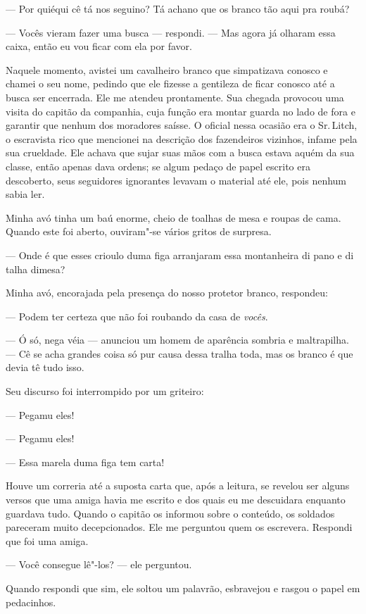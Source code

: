 --- Por quiéqui cê tá nos seguino? Tá achano que os branco tão aqui pra
roubá?

--- Vocês vieram fazer uma busca ---
respondi. --- Mas agora já olharam essa caixa, então eu vou ficar com
ela por favor.

Naquele momento, avistei um cavalheiro
branco que simpatizava conosco e chamei o seu nome, pedindo que ele
fizesse a gentileza de ficar conosco até a busca ser encerrada. Ele me
atendeu prontamente. Sua chegada provocou uma visita do capitão da
companhia, cuja função era montar guarda no lado de fora e garantir que
nenhum dos moradores saísse. O oficial nessa ocasião era o Sr.\,Litch, o
escravista rico que mencionei na descrição dos fazendeiros vizinhos,
infame pela sua crueldade. Ele achava que sujar suas mãos com a busca
estava aquém da sua classe, então apenas dava ordens; se algum pedaço de
papel escrito era descoberto, seus seguidores ignorantes levavam o
material até ele, pois nenhum sabia ler.

Minha avó tinha um baú enorme, cheio de
toalhas de mesa e roupas de cama. Quando este foi aberto, ouviram"-se
vários gritos de surpresa.

--- Onde é que esses crioulo duma figa arranjaram essa montanheira di
pano e di talha dimesa?

Minha avó, encorajada pela presença do
nosso protetor branco, respondeu:

--- Podem ter certeza que não foi roubando da casa de \emph{vocês}.

--- Ó só, nega véia --- anunciou um
homem de aparência sombria e maltrapilha. --- Cê se acha grandes coisa
só pur causa dessa tralha toda, mas os branco é que devia tê tudo isso.

Seu discurso foi interrompido por um
griteiro:

--- Pegamu eles!

--- Pegamu eles!

--- Essa marela duma figa tem carta!

Houve um correria até a suposta carta
que, após a leitura, se revelou ser alguns versos que uma amiga havia me
escrito e dos quais eu me descuidara enquanto guardava tudo. Quando o
capitão os informou sobre o conteúdo, os soldados pareceram muito
decepcionados. Ele me perguntou quem os escrevera. Respondi que foi uma
amiga.

--- Você consegue lê"-los? --- ele perguntou.

Quando respondi que sim, ele soltou um palavrão, esbravejou e rasgou o
papel em pedacinhos.

